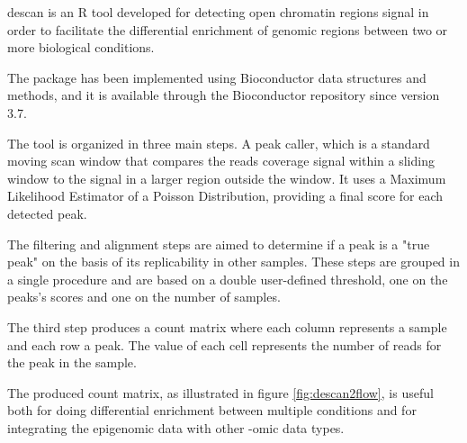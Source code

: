 \gls{descan} is an R \cite{Ihaka1996} tool developed for detecting open chromatin regions signal in order to facilitate the differential enrichment of genomic regions between two or more biological conditions.

The package has been implemented using Bioconductor \cite{Gentleman2004} data structures and methods, and it is available through the Bioconductor repository since version 3.7.

The tool is organized in three main steps. 
A peak caller, which is a standard moving scan window that compares the reads coverage signal within a sliding window to the signal in a larger region outside the window. It uses a Maximum Likelihood Estimator of a Poisson Distribution, providing a final score for each detected peak.

The filtering and alignment steps are aimed to determine if a peak is a "true peak" on the basis of its replicability in other samples. 
These steps are grouped in a single procedure and are based on a double user-defined threshold, one on the peaks's scores and one on the number of samples.

The third step produces a count matrix where each column represents a sample and each row a peak. The value of each cell represents the number of reads for the peak in the sample.

The produced count matrix, as illustrated in figure \ref{fig:descan2flow}, is useful both for doing differential enrichment between multiple conditions and for integrating the epigenomic data with other -omic data types.



